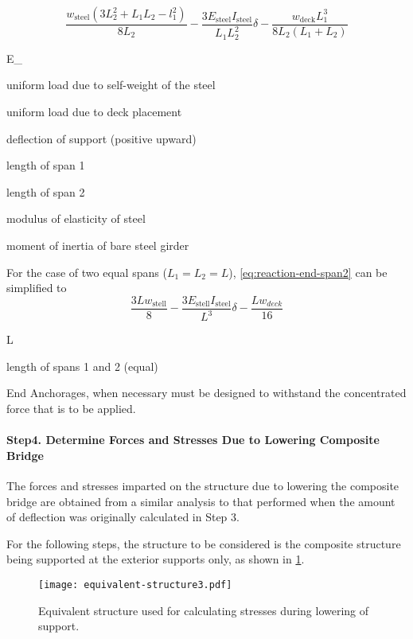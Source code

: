 \begin{equation}
  \label{eq:reaction-end-span2}
  \frac{w_\text{steel}(3L_2^2+L_1L_2-l_1^2)}{8L_2}-\frac{3E_\text{steel}I_\text{steel}}{L_1L_2^2}\delta-\frac{w_\text{deck}L_1^3}{8L_2(L_1+L_2)}
\end{equation}
\begin{EqDesc}{E_}
  \item[w_\text{steel}] uniform load due to self-weight of the steel
  \item[w_\text{deck}] uniform load due to deck placement
  \item[\delta] deflection of support (positive upward)
  \item[L_1] length of span 1
  \item[L_2] length of span 2
  \item[E_\text{steel}] modulus of elasticity of steel
  \item[I_\text{steel}] moment of inertia of bare steel girder
\end{EqDesc}

For the case of two equal spans ($L_1=L_2=L$), \cref{eq:reaction-end-span2} can be simplified to
\begin{equation}
  \frac{3Lw_\text{stell}}{8}-\frac{3E_\text{stell}I_\text{steel}}{L^3}\delta-\frac{Lw_{deck}}{16}
\end{equation}
\begin{EqDesc}{L}
  \item[L]  length of spans 1 and 2 (equal)
\end{EqDesc}

End Anchorages, when necessary must be designed to withstand the concentrated force that is to be applied.

\paragraph*{Step4. Determine Forces and Stresses Due to Lowering Composite Bridge}

The forces and stresses imparted on the structure due to lowering the composite bridge are obtained from a similar analysis to that performed when the amount of deflection was originally calculated in Step 3.

For the following steps, the structure to be considered is the composite structure being supported at the exterior supports only, as shown in \cref{fig:equivalent-structure3}.

\begin{figure}
  \texttt{[image: equivalent-structure3.pdf]}
  \caption{Equivalent structure used for calculating stresses during lowering of support.}
  \label{fig:equivalent-structure3}
\end{figure}

